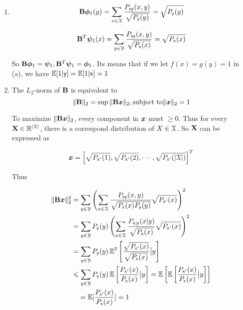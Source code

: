 \documentclass[a4paper]{article}
\begin{document}
\begin{enumerate}
\begin{enumerate}
    \item \begin{equation}
      \mathbf{B} \bm{\phi}_1(y) = \sum_{x\in \mathcal{X}}\frac{P_{\mathsf{x}\mathsf{y}}(x,y)}{\sqrt{P_{\mathsf{y}}(y)}} = \sqrt{P_{\mathsf{y}}(y)} 
    \end{equation}

    \begin{equation}
      \mathbf{B}^T \bm{\psi}_1(x) = \sum_{y\in \mathcal{Y}}\frac{P_{\mathsf{x}\mathsf{y}}(x,y)}{\sqrt{P_{\mathsf{x}}(x)}} = \sqrt{P_{\mathsf{x}}(x)} 
    \end{equation}

    So $\mathbf{B}\bm{\phi}_1 = \bm{\psi}_1, \mathbf{B}^T\bm{\psi}_1 = \bm{\phi}_1$. Its means that if we let $f(x)=g(y)=1$ in (a), we have $\operatorname{\mathbb{E}}[1|\mathsf{y}] = \operatorname{\mathbb{E}}[1|\mathsf{x}] = 1$

    \item  The $L_2$-norm of $\mathbf{B}$ is equivalent to 
    \begin{equation}
      \| \mathbf{B} \|_2  = \sup \| \mathbf{B} \bm{x} \|_2, \mathrm{subject~to}  \| \bm{x} \|_2 = 1
    \end{equation}

    To maximize $\| \mathbf{B} \bm{x} \|_2$, every component in $\bm{x}$ must $\geqslant 0 $. Thus for every $\mathbf{X} \in \mathbb{R}^{|\mathcal{X}|}$, there is a correspond distribution of $X \in \mathcal{X}$. So $\mathbf{X}$ can be expressed as 
    
    \begin{equation}
      \bm{x} = \left[\sqrt{P_{\mathsf{x}'}(1)},\sqrt{P_{\mathsf{x}'}(2)},\cdots,\sqrt{P_{\mathsf{x}'}(|\mathcal{X}|)}\right]^T
    \end{equation}

    Thus 

    \begin{equation}
      \begin{aligned}
        \| \mathbf{B} \bm{x} \|^2_2 & = \sum_{y \in \mathcal{Y}} \left(\sum_{x\in \mathcal{X}} \frac{P_{\mathsf{x}\mathsf{y}}(x,y)}{\sqrt{P_{\mathsf{x}}(x)P_{\mathsf{y}}(y)}} \sqrt{P_{\mathsf{x}'}(x)} \right)^2  \\
        & = \sum_{y \in \mathcal{Y}}P_{\mathsf{y}}(y)  \left(\sum_{x\in \mathcal{X}} \frac{P_{\mathsf{x}|\mathsf{y}}(x|y)}{\sqrt{P_{\mathsf{x}}(x)}} \sqrt{P_{\mathsf{x}'}(x)} \right)^2 \\
        & = \sum_{y \in \mathcal{Y}}P_{\mathsf{y}}(y)  \operatorname{\mathbb{E}}^2\left[\frac{\sqrt{P_{\mathsf{x}'}(x)}}{\sqrt{P_{\mathsf{x}}(x)}} \big| y \right] \\
        & \leqslant \sum_{y \in \mathcal{Y}}P_{\mathsf{y}}(y) \operatorname{\mathbb{E}}\left[\frac{P_{\mathsf{x}'}(x)}{P_{\mathsf{x}}(x)} \big| y \right] = \operatorname{\mathbb{E}} \left[\operatorname{\mathbb{E}}\left[\frac{P_{\mathsf{x}'}(x)}{P_{\mathsf{x}}(x)} \big| y \right] \right] \\
        & \quad = \operatorname{\mathbb{E}} [\frac{P_{\mathsf{x}'}(x)}{P_{\mathsf{x}}(x)}] = 1
      \end{aligned}
    \end{equation}


\end{enumerate}
\end{enumerate}
\end{document}
